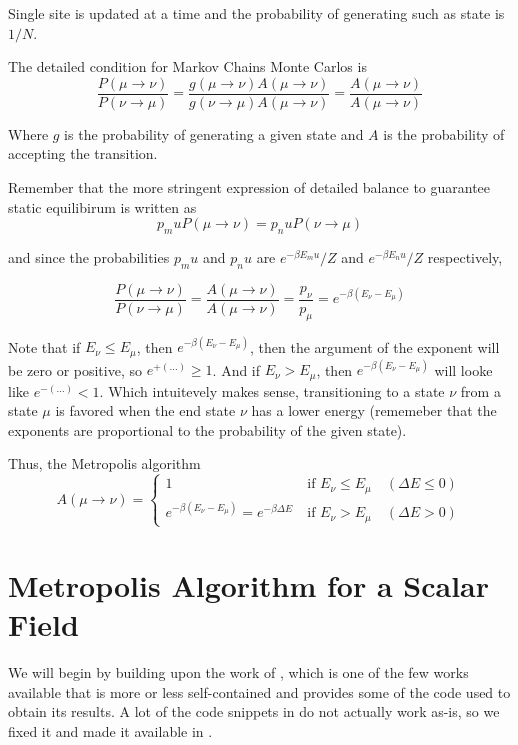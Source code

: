 Single site is updated at a time and the probability of generating such as state is $1/N$.

The detailed condition for Markov Chains Monte Carlos is
$$
\frac{P(\mu \rightarrow \nu)}{P(\nu \rightarrow \mu)}
= \frac{g(\mu \rightarrow \nu) A(\mu \rightarrow \nu)}{g(\nu \rightarrow \mu) A(\mu \rightarrow \nu)}
= \frac{A(\mu \rightarrow \nu)}{A(\mu \rightarrow \nu)}
$$

Where $g$ is the probability of generating a given state and $A$ is the probability of accepting the transition.

Remember that the more stringent expression of detailed balance to guarantee static equilibirum is written as
$$
p_mu P(\mu\rightarrow\nu) = p_nu P(\nu\rightarrow\mu)
$$

and since the probabilities $p_mu$ and $p_nu$ are $e^{-\beta E_mu}/Z$ and $e^{-\beta E_nu}/Z$ respectively,

$$
\frac{P(\mu \rightarrow \nu)}{P(\nu \rightarrow \mu)}
= \frac{A(\mu \rightarrow \nu)}{A(\mu \rightarrow \nu)}
= \frac{p_\nu}{p_\mu}
= e^{-\beta (E_\nu - E_\mu)}
$$

Note that if $E_\nu \leq E_\mu$, then $e^{-\beta (E_\nu - E_\mu)}$, then the argument of the exponent will be zero
or positive, so $e^{+(\ldots)} \geq 1$.
And if $E_\nu > E_\mu$, then $e^{-\beta (E_\nu - E_\mu)}$ will looke like $e^{-(\ldots)} < 1$.
Which intuitevely makes sense, transitioning to a state $\nu$ from a state $\mu$ is favored when
the end state $\nu$ has a lower energy (rememeber that the exponents are proportional to the probability of the given state).

Thus, the Metropolis algorithm 
$$
A(\mu \rightarrow \nu)
=
\begin{cases}
    1                                                    & \text{if } E_\nu \leq E_\mu \quad(\Delta E \leq 0) \\
    e^{-\beta (E_\nu - E_\mu)} = e^{-\beta \Delta E} \   & \text{if } E_\nu > E_\mu \quad(\Delta E > 0)
\end{cases}
$$



\section{Metropolis Algorithm for a Scalar Field}

We will begin by building upon the work of \cite{david-lattice-qft}, which is one of the few works available that is more or
less self-contained and provides some of the code used to obtain its results.
A lot of the code snippets in \cite{david-lattice-qft} do not actually work as-is, so we fixed it and made it
available in \cite{our-phi-4}.

